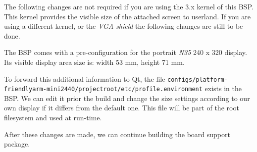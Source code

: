 \begin{important}
The following changes are not required if you are using the 3.x kernel of
this BSP. This kernel provides the visible size of the attached screen to userland.
If you are using a different kernel, or the \textit{VGA shield} the following changes
are still to be done.
\end{important}

The BSP comes with a pre-configuration for the portrait \textit{N35}
240 x 320 display. Its visible display area size is: width 53 mm, height 71 mm.

To forward this additional information to Qt, the file
\texttt{configs/platform-friendlyarm-mini2440/projectroot/etc/profile.environment}
exists in the BSP. We can edit it prior the build and change the size settings
according to our own display if it differs from the default one. This file will
be part of the root filesystem and used at run-time.

After these changes are made, we can continue building the board support
package.
